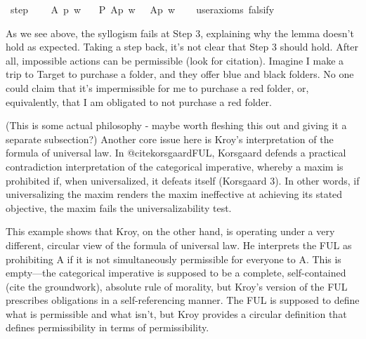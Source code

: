 \begin{isabellebody}
\isadelimproof
\isanewline
%
\endisadelimproof
\isanewline
{}\isamarkupfalse%
\ step{}{\isacharcolon}\ \isanewline
\ \ \ A\ p\ w\isanewline
\ \ \ {\isachardoublequoteopen}P\ {\isacharbraceleft}A{\isacharparenleft}p{\isacharparenright}{\isacharbraceright}\ w\ {\isasymlongrightarrow}\ {\isacharparenleft}{\isasymdiamond}\ {\isacharparenleft}A{\isacharparenleft}p{\isacharparenright}{\isacharparenright}\ w{\isacharparenright}{\isachardoublequoteclose}\isanewline
\ \ \isamarkupfalse%
\ {\isacharbrackleft}user{\isacharunderscore}axioms{\isacharcomma}\ falsify{\isacharbrackright}%
\isadelimproof
\ %
\endisadelimproof
%
\isatagproof
{}\isamarkupfalse%
\isanewline
%
%
\endisatagproof
{\isafoldproof}%
%
\isadelimproof
%
\endisadelimproof
%
\begin{isamarkuptext}%
As we see above, the syllogism fails at Step 3, explaining why the lemma doesn't 
        hold as expected. Taking a step back, it's not clear that Step 3 should hold. After all,
        impossible actions can be permissible (look for citation). Imagine I make a trip to Target to 
        purchase a folder, and they offer blue and black folders. No one could claim that it's impermissible
        for me to purchase a red folder, or, equivalently, that I am obligated to not purchase a red folder.%
\end{isamarkuptext}\isamarkuptrue%
%
\begin{isamarkuptext}%
(This is some actual philosophy - maybe worth fleshing this out and giving it a separate subsection?)
        Another core issue here is Kroy's interpretation of the formula of universal law. In @cite{korsgaardFUL}, 
        Korsgaard defends a practical contradiction interpretation of the categorical imperative, whereby 
        a maxim is prohibited if, when universalized, it defeats itself (Korsgaard 3). In other words, if universalizing
        the maxim renders the maxim ineffective at achieving its stated objective, the maxim fails the
        universalizability test. 

        This example shows that Kroy, on the other hand, is operating under a very different, circular view of 
        the formula of universal law. He interprets the FUL as prohibiting A if it is not simultaneously 
        permissible for everyone to A. This is empty—the categorical imperative is supposed to be a complete,
        self-contained (cite the groundwork), absolute rule of morality, but Kroy's version of the FUL prescribes obligations 
        in a self-referencing manner. The FUL is supposed to define what is permissible and what isn't, 
        but Kroy provides a circular definition that defines permissibility in terms of permissibility.
        

\end{isamarkuptext}
\end{isabellebody}
